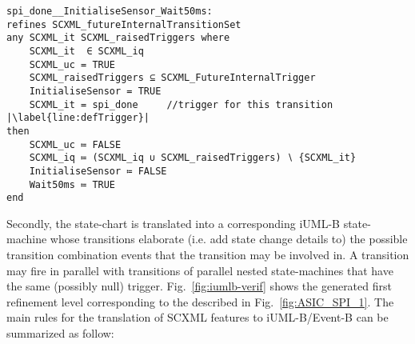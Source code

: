 \begin{lstlisting}[caption={Event-B event corresponding to internal triggered transition to \textbf{Wait50ms} state in refinement level 1 shown in Fig.~\ref{fig:ASIC}}, label={lst:SecBotMach0},language=Event-B, escapechar=|, frame=single, float=t]
spi_done__InitialiseSensor_Wait50ms:	
refines SCXML_futureInternalTransitionSet 
any SCXML_it SCXML_raisedTriggers where
	SCXML_it  ∈ SCXML_iq 
	SCXML_uc = TRUE
	SCXML_raisedTriggers ⊆ SCXML_FutureInternalTrigger
	InitialiseSensor = TRUE
	SCXML_it = spi_done  	//trigger for this transition |\label{line:defTrigger}|
then
	SCXML_uc ≔ FALSE
	SCXML_iq ≔ (SCXML_iq ∪ SCXML_raisedTriggers) ∖ {SCXML_it}
	InitialiseSensor ≔ FALSE
	Wait50ms ≔ TRUE
end
\end{lstlisting}

Secondly, the \SCXML state-chart is translated into a corresponding iUML-B state-machine whose transitions elaborate (i.e. add state change details to) the possible transition combination events that the transition may be involved in. 
A transition may fire in parallel with transitions of parallel nested state-machines that have the same (possibly null) trigger.
Fig.~\ref{fig:iumlb-verif} shows the generated \iUMLB first refinement level corresponding to the \IDS described in Fig.~\ref{fig:ASIC_SPI_1}. 
The main rules for the translation of SCXML features to iUML-B/Event-B can be summarized as follow:

